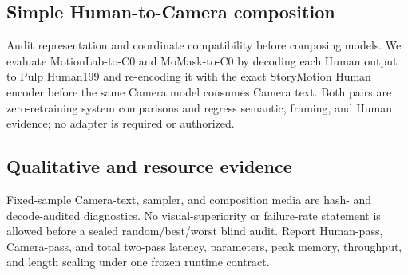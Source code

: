 \subsection{Simple Human-to-Camera composition}

Audit representation and coordinate compatibility before composing models. We evaluate
MotionLab-to-C0 and MoMask-to-C0 by decoding each Human output to Pulp Human199 and re-encoding it
with the exact StoryMotion Human encoder before the same Camera model consumes Camera text. Both
pairs are zero-retraining system comparisons and regress semantic, framing, and Human evidence;
no adapter is required or authorized.

\subsection{Qualitative and resource evidence}

Fixed-sample Camera-text, sampler, and composition media are hash- and decode-audited diagnostics.
No visual-superiority or failure-rate statement is allowed before a sealed random/best/worst
blind audit. Report Human-pass, Camera-pass, and total two-pass latency, parameters, peak memory,
throughput, and length scaling under one frozen runtime contract.
